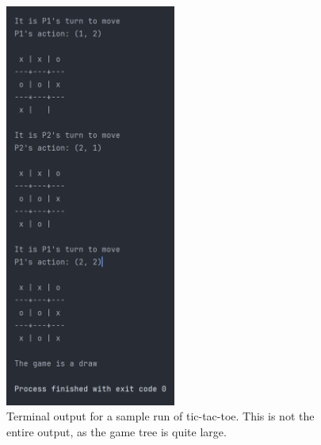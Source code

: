 \documentclass[11pt]{article}
\begin{document}
\begin{figure}[H]
    \centering
    \includegraphics[width=0.5\textwidth]{Images/tic_tac_toe}
    \caption{Terminal output for a sample run of tic-tac-toe. This is not the entire output, as the game tree is quite large.}
    \label{fig:tic_tac_toe_terminal_output}
\end{figure}
\end{document}
